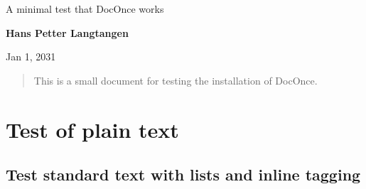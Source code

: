 \documentclass[%
twoside,                 %
final,                   %
10pt]{article}
\begin{document}








\thispagestyle{empty}

\begin{center}
{\LARGE\bf
\begin{spacing}{1.25}
A minimal test that DocOnce works
\end{spacing}
}
\end{center}


\begin{center}
{\bf Hans Petter Langtangen${}^{}$} \\ [0mm]
\end{center}

    \begin{center}
\end{center}
    

\begin{center} %
Jan 1, 2031
\end{center}

\vspace{1cm}

\begin{abstract}
This is a small document for testing the installation of DocOnce.

\end{abstract}

\tableofcontents


\vspace{1cm} %




\section{Test of plain text}

\subsection{Test standard text with lists and inline tagging}
\end{document}
